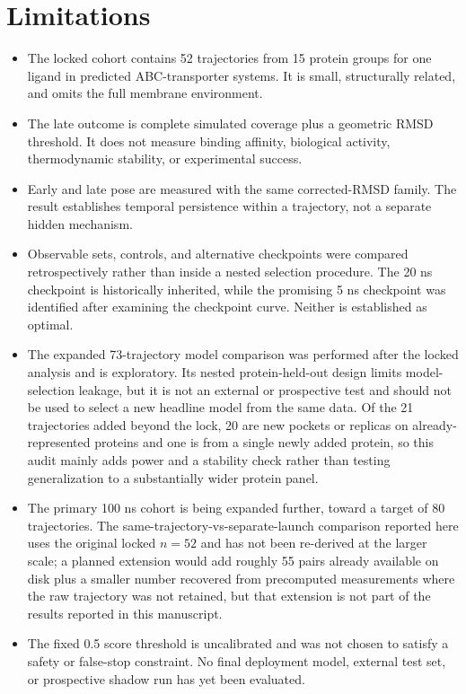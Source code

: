 \documentclass[11pt]{article}
\begin{document}
\section{Limitations}

\begin{itemize}
    \item The locked cohort contains 52 trajectories from 15 protein groups for one ligand in predicted ABC-transporter systems. It is small, structurally related, and omits the full membrane environment.
    \item The late outcome is complete simulated coverage plus a geometric RMSD threshold. It does not measure binding affinity, biological activity, thermodynamic stability, or experimental success.
    \item Early and late pose are measured with the same corrected-RMSD family. The result establishes temporal persistence within a trajectory, not a separate hidden mechanism.
    \item Observable sets, controls, and alternative checkpoints were compared retrospectively rather than inside a nested selection procedure. The 20 ns checkpoint is historically inherited, while the promising 5 ns checkpoint was identified after examining the checkpoint curve. Neither is established as optimal.
    \item The expanded 73-trajectory model comparison was performed after the locked analysis and is exploratory. Its nested protein-held-out design limits model-selection leakage, but it is not an external or prospective test and should not be used to select a new headline model from the same data. Of the 21 trajectories added beyond the lock, 20 are new pockets or replicas on already-represented proteins and one is from a single newly added protein, so this audit mainly adds power and a stability check rather than testing generalization to a substantially wider protein panel.
    \item The primary 100 ns cohort is being expanded further, toward a target of 80 trajectories. The same-trajectory-vs-separate-launch comparison reported here uses the original locked $n=52$ and has not been re-derived at the larger scale; a planned extension would add roughly 55 pairs already available on disk plus a smaller number recovered from precomputed measurements where the raw trajectory was not retained, but that extension is not part of the results reported in this manuscript.
    \item The fixed 0.5 score threshold is uncalibrated and was not chosen to satisfy a safety or false-stop constraint. No final deployment model, external test set, or prospective shadow run has yet been evaluated.

\end{itemize}
\end{document}
